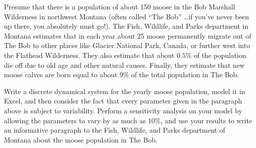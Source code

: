         \begin{lab}
            Presume that there is a population of about 150 moose in the Bob Marshall
            Wilderness in northwest Montana (often called ``The Bob'' \dots if you've never
            been up there, you absolutely must go!).  The Fish, Wildlife, and Parks department
            in Montana estimates that in each year about 25 moose permanently migrate out of
            The Bob to other places like Glacier National Park, Canada, or further west into
            the Flathead Wilderness.  They also estimate that about $0.5\%$ of the population
            die off due to old age and other natural causes.  Finally, they estimate that new
            moose calves are born equal to about $9\%$ of the total population in The Bob.

            Write a discrete dynamical system for the yearly moose population, model it in
            Excel, and then consider the fact that every parameter given in the paragraph
            above is subject to variability.  Perform a sensitivity analysis on your model by
            allowing the parameters to vary by as much as 10\%, and use your results to write
            an informative paragraph to the Fish, Wildlife, and Parks department of Montana
            about the moose population in The Bob. 

        \end{lab}



